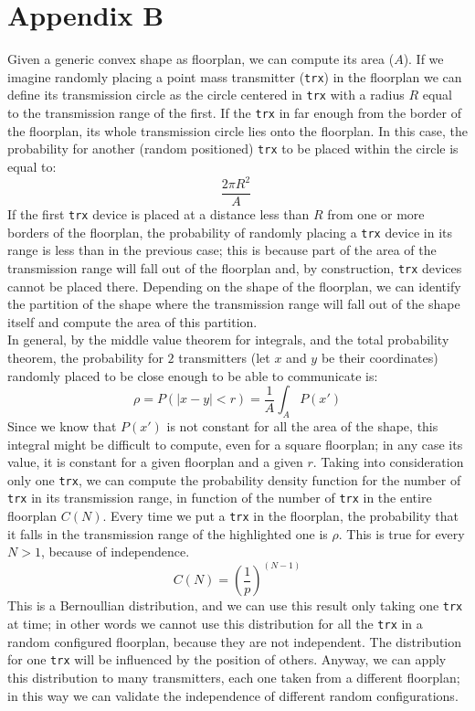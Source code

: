 \section*{Appendix B}
\label{app:b}
Given a generic convex shape as floorplan, we can compute its area ($A$). If we
imagine randomly placing a point mass transmitter (\texttt{trx}) in the floorplan we can define its transmission circle as the circle centered in \texttt{trx} with a radius $R$ equal to the transmission range of the first. If the \texttt{trx}
in far enough from the border of the floorplan, its whole transmission circle lies
onto the floorplan. In this case, the probability for another (random
positioned) \texttt{trx} to be placed within the circle is equal to:
\begin{equation*}
    \frac{2\pi R^2}{A} \ 
\end{equation*}
If the first \texttt{trx} device is placed at a distance less than $R$ from one
or more borders of the floorplan, the probability of randomly placing a
\texttt{trx} device in its range is less than in the previous case; this is
because part of the area of the transmission range will fall out of the
floorplan and, by construction, \texttt{trx} devices cannot be placed there. 
Depending on the shape of the floorplan, we can identify the partition of the shape
where the transmission range will fall out of the shape itself and compute the area of this partition.\\
In general, by the middle value theorem for integrals, and the total probability
theorem, the probability for $2$ transmitters (let $x$ and $y$ be their
coordinates) randomly placed to be close enough to be able to communicate is:
\begin{equation*}
    \rho = P(|x-y|<r) = \frac{1}{A} \int_{A}^{} P(x')
\end{equation*}
Since we know that $P(x')$ is not constant for all the area of the shape, this
integral might be difficult to compute, even for a square floorplan; in any case
its value, it is constant for a given floorplan and a given $r$. Taking into
consideration only one \texttt{trx}, we can compute the probability density
function for the number of \texttt{trx} in its transmission range, in function
of the number of \texttt{trx} in the entire floorplan $C(N)$. Every time we put
a \texttt{trx} in the floorplan, the probability that it falls in the
transmission range of the highlighted one is $\rho$. This is true for every
$N > 1$, because of independence.
\begin{equation*}
    C(N)= \left(\frac{1}{p}\right)^{\left( N-1 \right)}
\end{equation*}
This is a Bernoullian distribution, and we can use this result only taking one
\texttt{trx} at time; in other words we cannot use this distribution for all the
\texttt{trx} in a random configured floorplan, because they are not independent. 
The distribution for one \texttt{trx} will be influenced by the position of
others. Anyway, we can apply this distribution to many transmitters, each one
taken from a different floorplan; in this way we can validate the independence
of different random configurations.
\newpage
